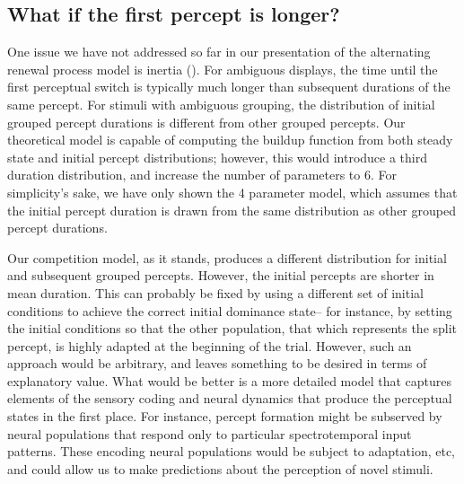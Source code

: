 \documentclass{frontiersSCNS} %
\begin{document}
\subsection{What if the first percept is longer?}

One issue we have not addressed so far in our presentation of the alternating renewal process model is inertia (\cite{Hupe2012}). For ambiguous displays, the time until the first perceptual switch is typically much longer than subsequent durations of the same percept. For stimuli with ambiguous grouping, the distribution of initial grouped percept durations is different from other grouped percepts. Our theoretical model is capable of computing the buildup function from both steady state and initial percept distributions; however, this would introduce a third duration distribution, and increase the number of parameters to 6. For simplicity's sake, we have only shown the 4 parameter model, which assumes that the initial percept duration is drawn from the same distribution as other grouped percept durations.

Our competition model, as it stands, produces a different distribution for initial and subsequent grouped percepts. However, the initial percepts are shorter in mean duration. This can probably be fixed by using a different set of initial conditions to achieve the correct initial dominance state-- for instance, by setting the initial conditions so that the other population, that which represents the split percept, is highly adapted at the beginning of the trial. However, such an approach would be arbitrary, and leaves something to be desired in terms of explanatory value. What would be better is a more detailed model that captures elements of the sensory coding and neural dynamics that produce the perceptual states in the first place. For instance, percept formation might be subserved by neural populations that respond only to particular spectrotemporal input patterns. These encoding neural populations would be subject to adaptation, etc, and could allow us to make predictions about the perception of novel stimuli.
\end{document}
